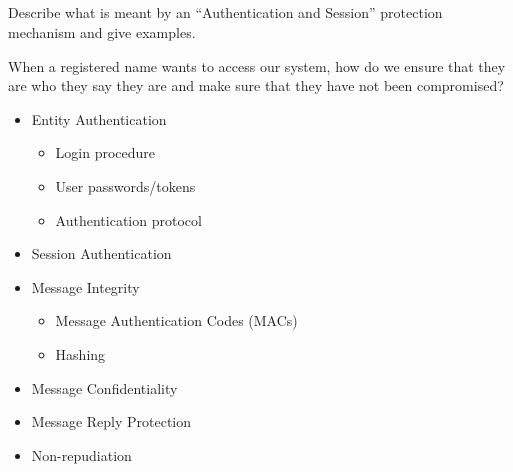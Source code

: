 \begin{questions}
\begin{parts}
  \part{} Describe what is meant by an ``Authentication and Session'' protection mechanism and give examples.
    \begin{solution}
      When a registered name wants to access our system, how do we ensure that they are who they say they are and make sure that they have not been compromised?
      \begin{itemize}[noitemsep]
      \item Entity Authentication
        \begin{itemize}[noitemsep]
        \item Login procedure
        \item User passwords/tokens
        \item Authentication protocol
        \end{itemize}
      \item Session Authentication
      \item Message Integrity
        \begin{itemize}[noitemsep]
        \item Message Authentication Codes (MACs)
        \item Hashing
        \end{itemize}
      \item Message Confidentiality
      \item Message Reply Protection
      \item Non-repudiation
      \end{itemize}
    \end{solution}


\end{parts}
\end{questions}
